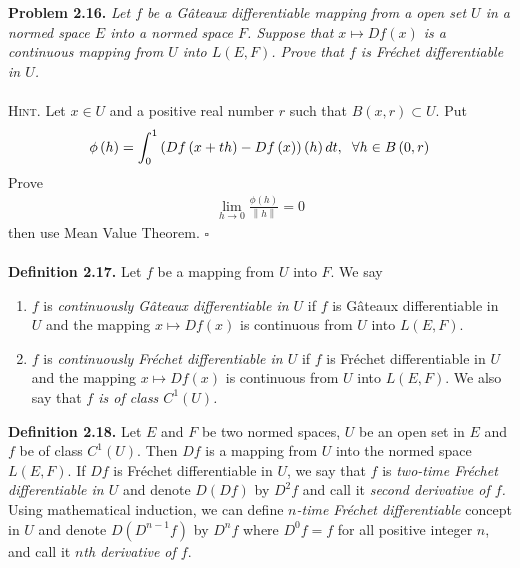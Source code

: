 \documentclass[a4paper]{article}
\numberwithin{equation}{section}
\begin{document}
\textbf{Problem 2.16.} \textit{Let $f$ be a G\^{a}teaux differentiable mapping from a open set $U$ in a normed space $E$ into a normed space $F$. Suppose that $x \mapsto Df\left( x \right)$ is a continuous mapping from $U$ into $L\left(E,F\right)$. Prove that $f$ is Fr\'{e}chet differentiable in $U$.}\\
\\
\textsc{Hint.} Let $x\in U$ and a positive real number $r$ such that $B\left(x,r\right)\subset U$. Put
\begin{align}
\phi \left( h \right) = \int_0^1 {\left( {Df\left( {x + th} \right) - Df\left( x \right)} \right)\left( h \right)dt} ,\hspace{0.2cm}\forall h \in B\left( {0,r} \right)
\end{align}
Prove 
\begin{align}
\mathop {\lim }\limits_{h \to 0} \frac{{\phi \left( h \right)}}{{\left\| h \right\|}} = 0
\end{align}
then use Mean Value Theorem. \hfill $\square$\\
\\
\textbf{Definition 2.17.} Let $f$ be a mapping from $U$ into $F$. We say
\begin{enumerate}
\item $f$ is \textit{continuously G\^{a}teaux differentiable in $U$} if $f$ is G\^{a}teaux differentiable in $U$ and the mapping $x \mapsto Df\left( x \right)$ is continuous from $U$ into $L\left(E,F\right)$.
\item $f$ is \textit{continuously Fr\'{e}chet differentiable in $U$} if $f$ is Fr\'{e}chet differentiable in $U$ and the mapping $x \mapsto Df\left( x \right)$ is continuous from $U$ into $L\left(E,F\right)$. We also say that \textit{$f$ is of class $C^1\left(U\right)$.}
\end{enumerate}
\textbf{Definition 2.18.} Let $E$ and $F$ be two normed spaces, $U$ be an open set in $E$ and $f$ be of class $C^1\left(U\right)$. Then $Df$ is a mapping from $U$ into the normed space $L\left(E,F\right)$. If $Df$ is Fr\'{e}chet differentiable in $U$, we say that $f$ is \textit{two-time Fr\'{e}chet differentiable in $U$} and denote $D\left(Df\right)$ by $D^2f$ and call it \textit{second derivative of $f$.}\\

Using mathematical induction, we can define \textit{$n$-time Fr\'{e}chet differentiable} concept in $U$ and denote $D\left(D^{n-1}f\right)$ by $D^nf$ where $D^0f=f$ for all positive integer $n$, and call it \textit{$n$th derivative of $f$}.
\end{document}

